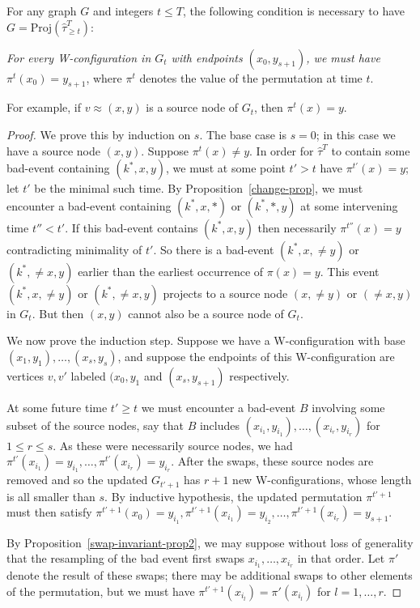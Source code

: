 \begin{proposition}
\label{future-prop2}
For any graph $G$ and integers $t \leq T$, the following condition is necessary to have $G = \text{Proj}(\hat \tau_{\geq t}^T)$:

\emph{For every W-configuration in $G_t$ with endpoints $(x_0, y_{s+1})$, we must have $\pi^t(x_0) = y_{s+1}$},
where $\pi^t$ denotes the value of the permutation at time $t$.

For example, if $v \approx (x,y)$ is a source node of $G_t$, then $\pi^t(x) = y$.
\end{proposition}
\begin{proof}
We prove this by induction on $s$. The base case is $s = 0$; in this case we have a source node $(x, y)$. Suppose $\pi^t(x) \neq y$. In order for $\hat \tau^T$ to contain some bad-event containing $(k^*, x,y)$, we must at some point $t' > t$ have $\pi^{t'} (x) = y$; let $t'$ be the minimal such time. By Proposition~\ref{change-prop}, we must encounter a bad-event containing $(k^*, x, *)$ or $(k^*, *, y)$ at some intervening time $t'' < t'$. If this bad-event contains $(k^*,x,y)$ then necessarily $\pi^{t''}(x) = y$ contradicting minimality of $t'$. So there is a bad-event $(k^*,x, \neq y)$ or $(k^*, \neq x, y)$ earlier than the earliest occurrence of $\pi(x) = y$. This event $(k^*, x, \neq y)$ or $(k^*, \neq x, y)$ projects to a source node $(x, \neq y)$ or $(\neq x, y)$ in $G_t$. But then $(x,y)$ cannot also be a source node of $G_t$. 

We now prove the induction step. Suppose we have a W-configuration with base $(x_1, y_1), \dots, (x_s, y_s)$, and suppose the endpoints of this W-configuration are vertices $v, v'$ labeled $(x_0, y_1$ and $(x_s, y_{s+1})$ respectively.

At some future time $t' \geq t$ we must encounter a bad-event $B$ involving some subset of the source nodes, say that $B$ includes $(x_{i_1}, y_{i_1}), \dots, (x_{i_r}, y_{i_r})$ for $1 \leq r \leq s$. As these were necessarily source nodes, we had $\pi^{t'} (x_{i_1}) =  y_{i_1}, \dots, \pi^{t'}(x_{i_r}) = y_{i_r}$. After the swaps, these source nodes are removed and so the updated $G_{t'+1}$ has $r+1$ new W-configurations, whose length is all smaller than $s$. By inductive hypothesis, the updated permutation $\pi^{t'+1}$ must then satisfy $\pi^{t'+1}(x_0) = y_{i_1}, \pi^{t'+1}(x_{i_1}) = y_{i_2}, \dots, \pi^{t'+1}(x_{i_r}) = y_{s+1}$.

By Proposition~\ref{swap-invariant-prop2}, we may suppose without loss of generality that the resampling of the bad event first swaps $x_{i_1}, \dots, x_{i_r}$ in that order. Let $\pi'$ denote the result of these swaps; there may be additional swaps to other elements of the permutation, but we must have $\pi^{t'+1}(x_{i_l}) = \pi'(x_{i_l})$ for $l = 1, \dots, r$.


\end{proof}
